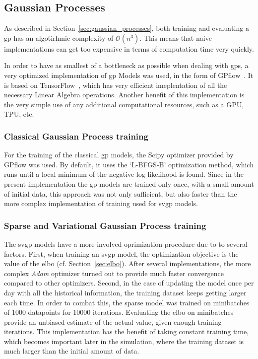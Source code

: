 \subsection{Gaussian Processes}

As described in Section~\ref{sec:gaussian_processes}, both training and
evaluating a \acrshort{gp} has an algotirhmic complexity of $\mathcal{O}(n^3)$.
This means that naive implementations can get too expensive in terms of
computation time very quickly.

In order to have as smallest of a bottleneck as possible when dealing with
\acrshort{gp}s, a very optimized implementation of \acrlong{gp} Models was
used, in the form of GPflow~\cite{matthewsGPflowGaussianProcess2017}. It is
based on TensorFlow~\cite{tensorflow2015-whitepaper}, which has very efficient
imeplentation of all the necessary Linear Algebra operations. Another benefit of
this implementation is the very simple use of any additional computational
resources, such as a GPU, TPU, etc.

\subsubsection{Classical Gaussian Process training}

For the training of the classical \acrshort{gp} models, the Scipy optimizer
provided by GPflow was used. By default, it uses the `L-BFGS-B' optimization
method, which runs until a local minimum of the negative log likelihood is
found. Since in the present implementation the \acrshort{gp} models are trained
only once, with a small amount of initial data, this approach was not only
sufficient, but also faster than the more complex implementation of training
used for \acrshort{svgp} models.

\subsubsection{Sparse and Variational Gaussian Process training}

The \acrshort{svgp} models have a more involved oprimization procedure due to to
several factors. First, when training an \acrshort{svgp} model, the optimization
objective is the value of the \acrshort{elbo} (cf. Section~\ref{sec:elbo}).
After several implementations, the more complex \textit{Adam} optimizer turned
out to provide much faster convergence compared to other optimizers. Second, in
the case of updating the model once per day with all the historical information,
the training dataset keeps getting larger each time. In order to combat this,
the sparse model was trained on minibatches of 1000 datapoints for 10000
iterations. Evaluating the \acrshort{elbo} on minibatches provide an unbiased
estimate of the actual value, given enough training iterations. This
implementation has the benefit of taking constant training time, which becomes
important later in the simulation, where the training dataset is much larger
than the initial amount of data.  

